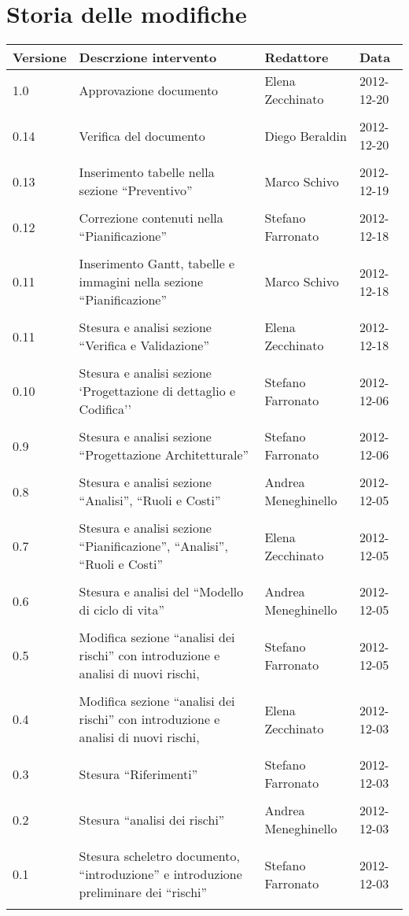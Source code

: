 \section*{Storia delle modifiche}
\begin{tabularx}{\textwidth}{lXll}
\toprule
Versione & Descrzione intervento & Redattore & Data\\
\midrule %
1.0 &Approvazione documento & Elena Zecchinato & 2012-12-20\\\\
0.14 &Verifica del documento & Diego Beraldin & 2012-12-20\\\\
0.13 &Inserimento tabelle nella sezione ``Preventivo'' & Marco Schivo & 2012-12-19\\\\
0.12 &Correzione contenuti nella ``Pianificazione'' & Stefano Farronato & 2012-12-18\\\\
0.11 &Inserimento Gantt, tabelle e immagini nella sezione ``Pianificazione'' & Marco Schivo & 2012-12-18\\\\
0.11 &Stesura e analisi sezione ``Verifica e Validazione'' & Elena Zecchinato & 2012-12-18\\\\
0.10 &Stesura e analisi sezione `Progettazione di dettaglio e Codifica'' & Stefano Farronato & 2012-12-06\\\\
0.9 &Stesura e analisi sezione ``Progettazione Architetturale'' & Stefano Farronato & 2012-12-06\\\\
0.8 &Stesura e analisi sezione ``Analisi'', ``Ruoli e Costi'' & Andrea Meneghinello & 2012-12-05\\\\
0.7 &Stesura e analisi sezione ``Pianificazione'', ``Analisi'', ``Ruoli e Costi'' & Elena Zecchinato & 2012-12-05\\\\
0.6 &Stesura e analisi del ``Modello di ciclo di vita'' & Andrea Meneghinello & 2012-12-05\\\\
0.5 &Modifica sezione ``analisi dei rischi'' con introduzione e analisi di nuovi rischi, & Stefano Farronato & 2012-12-05\\\\
0.4 & Modifica sezione ``analisi dei rischi'' con introduzione e analisi di nuovi rischi, & Elena Zecchinato & 2012-12-03\\\\
0.3 & Stesura ``Riferimenti'' & Stefano Farronato & 2012-12-03\\\\
0.2 & Stesura ``analisi dei rischi'' & Andrea Meneghinello & 2012-12-03\\\\
0.1 & Stesura scheletro documento, ``introduzione'' e introduzione preliminare dei ``rischi'' & Stefano Farronato & 2012-12-03\\\\
\bottomrule
\end{tabularx}
\newpage

